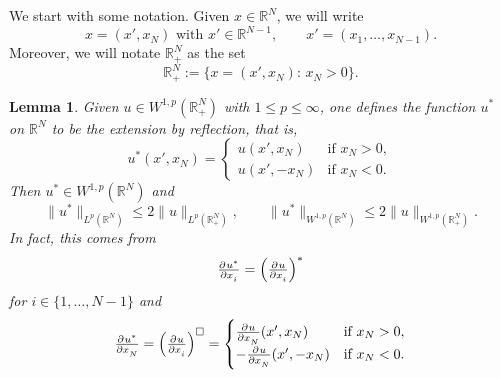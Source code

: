 \documentclass[a4paper,doc,11pt]{article}
\newtheorem{lemma}[theorem]{Lemma}
\newcommand{\R}{\mathbb{R}}
\begin{document}
We start with some notation. Given \( x \in \R^N\), we will write
\[
    x = (x', x_N) \text{ with } x' \in \R^{N-1}, \qquad 
    x' = (x_1, \ldots, x_{N-1}).
\]
Moreover, we will notate \(\R^N_+\) as the set
\[
    \R^N_+ := \{ x = (x',x_N): \, x_N > 0 \}.
\]

\begin{lemma}
    Given \( u \in W^{1,p} (\R^N_+)\) with \( 1 \leq p \leq \infty\), one defines the function \(u^*\) on \(\R^N\) to be the \emph{extension by reflection}, that is,
    \[
        u^* (x',x_N) = 
        \begin{cases}
            u (x',x_N) & \text{if } x_N > 0,
            \\
            u (x',-x_N) & \text{if } x_N < 0.
        \end{cases}
    \]
    Then \( u^* \in W^{1,p} (\R^N)\) and
    \[
        \|u^*\|_{L^p (\R^N)} \leq 2 \|u\|_{L^p (\R^N_+)},
        \qquad
        \|u^*\|_{W^{1,p} (\R^N)} \leq 2 \|u\|_{W^{1,p} (\R^N_+)}.
    \]
    In fact, this comes from
    \[
        \pd{u^*}{x_i} = \left( \pd{u}{x_i} \right)^* 
    \]
    for \( i \in \{1,\ldots, N-1\}\) and
    \[
        \pd{u^*}{x_N} = \left( \pd{u}{x_i} \right)^{\square}
        =
        \begin{cases}
            \pd{u}{x_N} (x',x_N) & \text{if } x_N > 0,
            \\
            -\pd{u}{x_N} (x',-x_N) & \text{if } x_N < 0.
        \end{cases}
    \]
\end{lemma}
\end{document}
